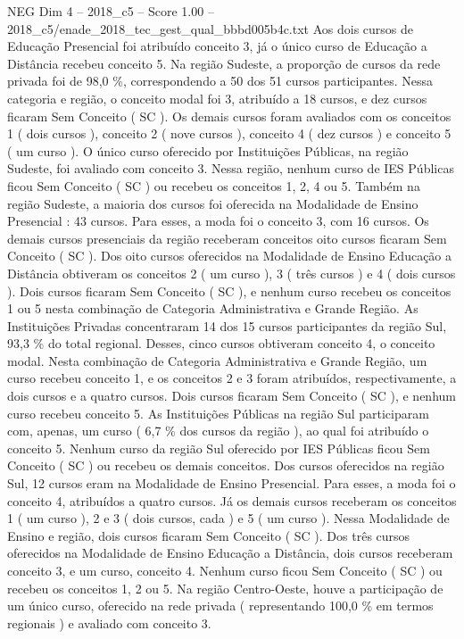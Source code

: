 \begin{textsample}{NEG Dim 4 – 2018\_c5 – Score 1.00 – 2018\_c5/enade\_2018\_tec\_gest\_qual\_bbbd005b4c.txt}
Aos dois cursos de Educação Presencial foi atribuído conceito 3, já o único curso de Educação a Distância recebeu conceito 5.
Na região Sudeste, a proporção de cursos da rede privada foi de 98,0 \%, correspondendo a 50 dos 51 cursos participantes.
Nessa categoria e região, o conceito modal foi 3, atribuído a 18 cursos, e dez cursos ficaram Sem Conceito ( SC ).
Os demais cursos foram avaliados com os conceitos 1 ( dois cursos ), conceito 2 ( nove cursos ), conceito 4 ( dez cursos ) e conceito 5 ( um curso ).
O único curso oferecido por Instituições Públicas, na região Sudeste, foi avaliado com conceito 3.
Nessa região, nenhum curso de IES Públicas ficou Sem Conceito ( SC ) ou recebeu os conceitos 1, 2, 4 ou 5.
Também na região Sudeste, a maioria dos cursos foi oferecida na Modalidade de Ensino Presencial : 43 cursos.
Para esses, a moda foi o conceito 3, com 16 cursos.
Os demais cursos presenciais da região receberam conceitos oito cursos ficaram Sem Conceito ( SC ).
Dos oito cursos oferecidos na Modalidade de Ensino Educação a Distância obtiveram os conceitos 2 ( um curso ), 3 ( três cursos ) e 4 ( dois cursos ).
Dois cursos ficaram Sem Conceito ( SC ), e nenhum curso recebeu os conceitos 1 ou 5 nesta combinação de Categoria Administrativa e Grande Região.
As Instituições Privadas concentraram 14 dos 15 cursos participantes da região Sul, 93,3 \% do total regional.
Desses, cinco cursos obtiveram conceito 4, o conceito modal.
Nesta combinação de Categoria Administrativa e Grande Região, um curso recebeu conceito 1, e os conceitos 2 e 3 foram atribuídos, respectivamente, a dois cursos e a quatro cursos.
Dois cursos ficaram Sem Conceito ( SC ), e nenhum curso recebeu conceito 5.
As Instituições Públicas na região Sul participaram com, apenas, um curso ( 6,7 \% dos cursos da região ), ao qual foi atribuído o conceito 5.
Nenhum curso da região Sul oferecido por IES Públicas ficou Sem Conceito ( SC ) ou recebeu os demais conceitos.
Dos cursos oferecidos na região Sul, 12 cursos eram na Modalidade de Ensino Presencial.
Para esses, a moda foi o conceito 4, atribuídos a quatro cursos.
Já os demais cursos receberam os conceitos 1 ( um curso ), 2 e 3 ( dois cursos, cada ) e 5 ( um curso ).
Nessa Modalidade de Ensino e região, dois cursos ficaram Sem Conceito ( SC ).
Dos três cursos oferecidos na Modalidade de Ensino Educação a Distância, dois cursos receberam conceito 3, e um curso, conceito 4.
Nenhum curso ficou Sem Conceito ( SC ) ou recebeu os conceitos 1, 2 ou 5.
Na região Centro-Oeste, houve a participação de um único curso, oferecido na rede privada ( representando 100,0 \% em termos regionais ) e avaliado com conceito 3.

\end{textsample}
